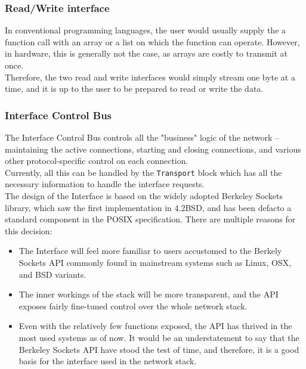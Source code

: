 \subsubsection{Read/Write interface}
In conventional programming languages, the user would usually supply the a 
function call with an array or a list on which the function can operate.
However, in hardware, this is generally not the case, as arrays are costly to 
transmit at once.\\
Therefore, the two read and write interfaces would simply stream one byte at a 
time, and it is up to the user to be prepared to read or write the data.


\subsubsection{Interface Control Bus}
The Interface Control Bus controls all the "business" logic of the network -- 
maintaining the active connections, starting and closing connections, and various
other protocol-specific control on each connection.\\ 
Currently, all this can be handled by the \texttt{Transport} block which has all 
the necessary information to handle the interface requests.\\
The design of the Interface is based on the widely adopted Berkeley Sockets library,
which saw the first implementation in 4.2BSD, and has been defacto a standard 
component in the POSIX specification\cite{tcpip_illustrated_vol2}. There are 
multiple reasons for this decision:
\begin{itemize}
\item The Interface will feel more familiar to users accustomed to the Berkely 
Sockets API commonly found in mainstream systems such as Linux, OSX, and BSD 
variants.

\item The inner workings of the stack will be more transparent, and the API 
exposes fairly fine-tuned control over the whole network stack.

\item Even with the relatively few functions exposed, the API
has thrived in the most used systems as of now. It would be an understatement to 
say that the Berkeley Sockets API have stood the test of time, and therefore, it
is a good basis for the interface used in the network stack.

\end{itemize}

